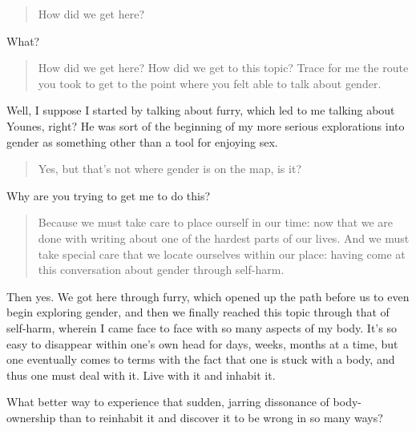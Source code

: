 \begin{quote}
How did we get here?
\end{quote}

What?

\begin{quote}
How did we get here? How did we get to this topic? Trace for me the route you took to get to the point where you felt able to talk about gender.
\end{quote}

Well, I suppose I started by talking about furry, which led to me talking about Younes, right? He was sort of the beginning of my more serious explorations into gender as something other than a tool for enjoying sex.

\begin{quote}
Yes, but that's not where gender is on the map, is it?
\end{quote}

Why are you trying to get me to do this?

\begin{quote}
Because we must take care to place ourself in our time: now that we are done with writing about one of the hardest parts of our lives. And we must take special care that we locate ourselves within our place: having come at this conversation about gender through self-harm.
\end{quote}

Then yes. We got here through furry, which opened up the path before us to even begin exploring gender, and then we finally reached this topic through that of self-harm, wherein I came face to face with so many aspects of my body. It's so easy to disappear within one's own head for days, weeks, months at a time, but one eventually comes to terms with the fact that one is stuck with a body, and thus one must deal with it. Live with it and inhabit it.

What better way to experience that sudden, jarring dissonance of body-ownership than to reinhabit it and discover it to be wrong in so many ways?
